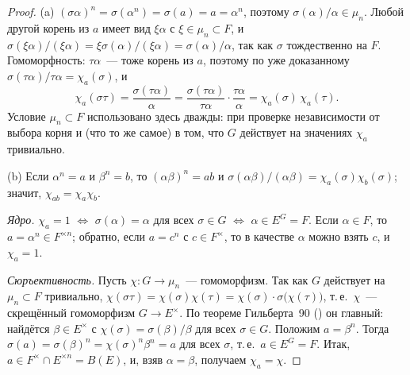 \begin{proof}
(a) $(\sigma\alpha)^n=\sigma(\alpha^n)=\sigma(a)=a=\alpha^n$, поэтому $\sigma(\alpha)/\alpha\in\mu_n$. Любой другой корень
из $a$ имеет вид $\xi\alpha$ с $\xi\in\mu_n\subset F$, и $\sigma(\xi\alpha)/(\xi\alpha)=\xi\sigma(\alpha)/(\xi\alpha)=
\sigma(\alpha)/\alpha$, так как $\sigma$ тождественно на $F$. Гомоморфность: $\tau\alpha$~--- тоже корень из $a$, поэтому
по уже доказанному $\sigma(\tau\alpha)/\tau\alpha=\chi_a(\sigma)$, и
\[
\chi_a(\sigma\tau)=\frac{\sigma(\tau\alpha)}{\alpha}=\frac{\sigma(\tau\alpha)}{\tau\alpha}\cdot\frac{\tau\alpha}{\alpha}
=\chi_a(\sigma)\,\chi_a(\tau).
\]
Условие $\mu_n\subset F$ использовано здесь дважды: при проверке независимости от выбора корня и (что то же самое) в том,
что $G$ действует на значениях $\chi_a$ тривиально.

(b) Если $\alpha^n=a$ и $\beta^n=b$, то $(\alpha\beta)^n=ab$ и $\sigma(\alpha\beta)/(\alpha\beta)=\chi_a(\sigma)\chi_b(\sigma)$;
значит, $\chi_{ab}=\chi_a\chi_b$.

\emph{Ядро.} $\chi_a=1$ $\iff$ $\sigma(\alpha)=\alpha$ для всех $\sigma\in G$ $\iff$ $\alpha\in E^G=F$. Если $\alpha\in F$, то
$a=\alpha^n\in F^{\times n}$; обратно, если $a=c^n$ с $c\in F^\times$, то в качестве $\alpha$ можно взять $c$, и
$\chi_a=1$.

\emph{Сюръективность.} Пусть $\chi\colon G\to\mu_n$~--- гомоморфизм. Так как $G$ действует на $\mu_n\subset F$
тривиально, $\chi(\sigma\tau)=\chi(\sigma)\chi(\tau)=\chi(\sigma)\cdot\sigma\bigl(\chi(\tau)\bigr)$, т.\,е.\ $\chi$~---
скрещённый гомоморфизм $G\to E^\times$. По теореме Гильберта~90 () он главный: найдётся $\beta\in E^\times$ с
$\chi(\sigma)=\sigma(\beta)/\beta$ для всех $\sigma\in G$. Положим $a=\beta^n$. Тогда
$\sigma(a)=\sigma(\beta)^n=\chi(\sigma)^n\beta^n=a$ для всех $\sigma$, т.\,е.\ $a\in E^G=F$. Итак, $a\in F^\times\cap
E^{\times n}=B(E)$, и, взяв $\alpha=\beta$, получаем $\chi_a=\chi$.
\end{proof}

